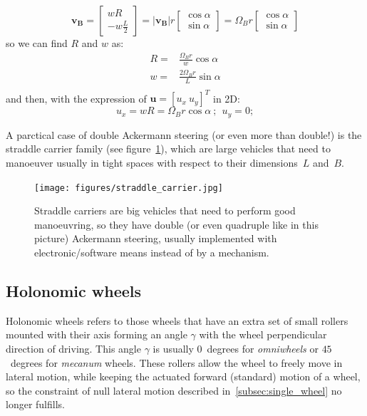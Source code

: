 \begin{equation}
\mathbf{v_B} = 
\left[
 \begin{array}{c}
  wR  \\
  -w\frac{L}{2} 
 \end{array}
\right]
=
|\mathbf{v_B}|r
\left[
 \begin{array}{c}
  \cos \alpha  \\
  \sin \alpha
 \end{array}
\right]
=
\Omega_Br
\left[
 \begin{array}{c}
  \cos \alpha  \\
  \sin \alpha
 \end{array}
\right]
\end{equation}
so we can find $R$ and $w$ as: 
\begin{align}
 R = & \frac{\Omega_B r}{w}\cos \alpha \\
 w = & \frac{2\Omega_B r}{L}\sin \alpha \\
\end{align}
and then, with the expression of $\mathbf{u}=\left[u_x\ u_y \right]^T$ in 2D: 
\begin{equation}
 u_x = wR = \Omega_Br \cos \alpha \ ; \ \ u_y = 0; 
\end{equation}

A parctical case of double Ackermann steering (or even more than double!) is the straddle carrier family (see figure~\ref{fig:straddle_carrier}), which are large vehicles that need to manoeuver usually in tight spaces with respect to their dimensions~$L$ and~$B$. 
\begin{figure}[bth!]
  \begin{center}
    \texttt{[image: figures/straddle\_carrier.jpg]}
    \caption{Straddle carriers are big vehicles that need to perform good manoeuvring, so they have double (or even quadruple like in this picture) Ackermann steering, usually implemented with electronic/software means instead of by a mechanism.}
    \label{fig:straddle_carrier}
  \end{center}
\end{figure}


\subsection{Holonomic wheels}
Holonomic wheels refers to those wheels that have an extra set of small rollers mounted with their axis forming an angle $\gamma$ with the wheel perpendicular direction of driving. This angle $\gamma$ is usually $0$~degrees for \textit{omniwheels} or $45$~degrees for \textit{mecanum} wheels. These rollers allow the wheel to freely move in lateral motion, while keeping the actuated forward (standard) motion of a wheel, so the constraint of null lateral motion described in~\ref{subsec:single_wheel} no longer fulfills. 

